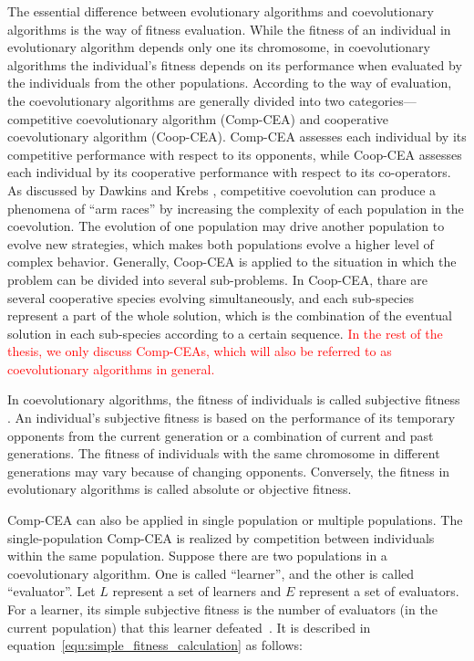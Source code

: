 The essential difference between evolutionary algorithms and coevolutionary algorithms is the way of fitness evaluation. While the fitness of an individual in evolutionary algorithm depends only one its chromosome, in coevolutionary algorithms the individual's fitness depends on its performance when evaluated by the individuals from the other populations. According to the way of evaluation, the coevolutionary algorithms are generally divided into two categories---competitive coevolutionary algorithm (Comp-CEA) and cooperative coevolutionary algorithm (Coop-CEA). Comp-CEA assesses each individual by its competitive performance with respect to its opponents, while Coop-CEA assesses each individual by its cooperative performance with respect to its co-operators. As discussed by Dawkins and Krebs \cite{Dawkins_1979}, competitive coevolution can produce a phenomena of ``arm races'' by increasing the complexity of each population in the coevolution. The evolution of one population may drive another population to evolve new strategies, which makes both populations evolve a higher level of complex behavior. Generally, Coop-CEA is applied to the situation in which the problem can be divided into several sub-problems. In Coop-CEA, thare are several cooperative species evolving simultaneously, and each sub-species represent a part of the whole solution, which is the combination of the eventual solution in each sub-species according to a certain sequence. \textcolor{red}{In the rest of the thesis, we only discuss Comp-CEAs, which will also be referred to as coevolutionary algorithms in general.}

In coevolutionary algorithms, the fitness of individuals is called subjective fitness \cite{John_2004}. An individual's subjective fitness is based on the performance of its temporary opponents from the current generation or a combination of current and past generations. The fitness of individuals with the same chromosome in different generations may vary because of changing opponents. Conversely, the fitness in evolutionary algorithms is called absolute or objective fitness.

Comp-CEA can also be applied in single population or multiple populations. The single-population Comp-CEA is realized by competition between individuals within the same population. Suppose there are two populations in a coevolutionary algorithm. One is called ``learner'', and the other is called ``evaluator''. Let $L$ represent a set of learners and $E$ represent a set of evaluators. For a learner, its simple subjective fitness is the number of evaluators (in the current population) that this learner defeated~\cite{Angeline_1993}. It is described in equation~\eqref{equ:simple_fitness_calculation} as follows:

